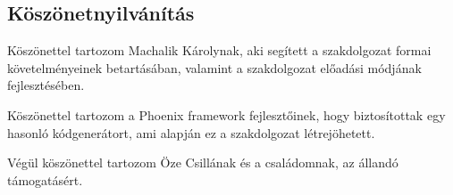 \begin{center}
\section*{Köszönetnyilvánítás}
\end{center}
\begin{justify}
Köszönettel tartozom Machalik Károlynak, aki segített a szakdolgozat formai követelményeinek betartásában, valamint a szakdolgozat előadási módjának fejlesztésében.

Köszönettel tartozom a Phoenix framework fejlesztőinek, hogy biztosítottak egy hasonló kódgenerátort, ami alapján ez a szakdolgozat létrejöhetett.

Végül köszönettel tartozom Öze Csillának és a családomnak, az állandó támogatásért.


\end{justify}